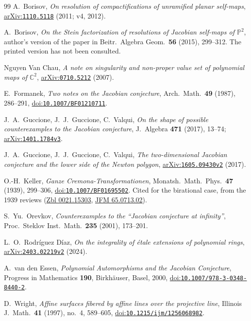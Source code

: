 \documentclass[a4paper,11pt]{article}
\theoremstyle{jsplain}
\theoremstyle{jsdef}
\theoremstyle{jsrem}
\begin{document}
\begin{thebibliography}{99}
 A.~Borisov, \textit{On resolution of compactifications of unramified planar self-maps}, \href{https://arxiv.org/abs/1110.5118}{arXiv:\nolinkurl{1110.5118}} (2011; v4, 2012).

 A.~Borisov, \textit{On the Stein factorization of resolutions of Jacobian self-maps of $\mathbb{P}^2$}, author's version of the paper in Beitr.\ Algebra Geom.\ \textbf{56} (2015), 299--312. The printed version has not been consulted.

 Nguyen Van Chau, \textit{A note on singularity and non-proper value set of polynomial maps of $\mathbb{C}^2$}, \href{https://arxiv.org/abs/0710.5212}{arXiv:\nolinkurl{0710.5212}} (2007).

 E.~Formanek, \textit{Two notes on the Jacobian conjecture}, Arch.\ Math.\ \textbf{49} (1987), 286--291, \href{https://doi.org/10.1007/BF01210711}{doi:\nolinkurl{10.1007/BF01210711}}.

 J.~A.~Guccione, J.~J.~Guccione, C.~Valqui, \textit{On the shape of possible counterexamples to the Jacobian conjecture}, J.\ Algebra \textbf{471} (2017), 13--74; \href{https://arxiv.org/abs/1401.1784v3}{arXiv:\nolinkurl{1401.1784v3}}.

 J.~A.~Guccione, J.~J.~Guccione, C.~Valqui, \textit{The two-dimensional Jacobian conjecture and the lower side of the Newton polygon}, \href{https://arxiv.org/abs/1605.09430v2}{arXiv:\nolinkurl{1605.09430v2}} (2017).

 O.-H.~Keller, \textit{Ganze Cremona-Transformationen}, Monatsh.\ Math.\ Phys.\ \textbf{47} (1939), 299--306, \href{https://doi.org/10.1007/BF01695502}{doi:\nolinkurl{10.1007/BF01695502}}. Cited for the birational case, from the 1939 reviews (\href{https://zbmath.org/?q=an:0021.15303}{Zbl 0021.15303}, \href{https://zbmath.org/?q=an:65.0713.02}{JFM 65.0713.02}).

 S.~Yu.~Orevkov, \textit{Counterexamples to the ``Jacobian conjecture at infinity''}, Proc.\ Steklov Inst.\ Math.\ \textbf{235} (2001), 173--201.

 L.~O.~Rodr\'iguez D\'iaz, \textit{On the integrality of \'etale extensions of polynomial rings}, \href{https://arxiv.org/abs/2403.02219v2}{arXiv:\nolinkurl{2403.02219v2}} (2024).

 A.~van den Essen, \textit{Polynomial Automorphisms and the Jacobian Conjecture}, Progress in Mathematics \textbf{190}, Birkh\"auser, Basel, 2000, \href{https://doi.org/10.1007/978-3-0348-8440-2}{doi:\nolinkurl{10.1007/978-3-0348-8440-2}}.

 D.~Wright, \textit{Affine surfaces fibered by affine lines over the projective line}, Illinois J.\ Math.\ \textbf{41} (1997), no.~4, 589--605, \href{https://doi.org/10.1215/ijm/1256068982}{doi:\nolinkurl{10.1215/ijm/1256068982}}.

\end{thebibliography}
\end{document}
